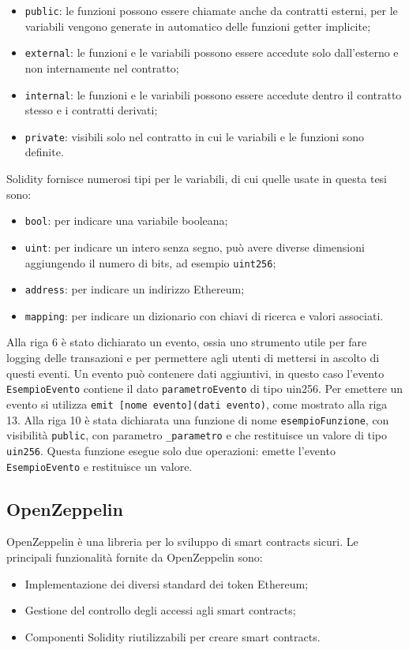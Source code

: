 \documentclass[a4paper]{article}
\begin{document}
      \begin{itemize}
        \item \verb|public|: le funzioni possono essere chiamate anche da contratti esterni, per le variabili vengono generate in automatico delle funzioni getter implicite;
        \item \verb|external|: le funzioni e le variabili possono essere accedute solo dall'esterno e non internamente nel contratto;
        \item \verb|internal|: le funzioni e le variabili possono essere accedute dentro il contratto stesso e i contratti derivati;
        \item \verb|private|: visibili solo nel contratto in cui le variabili e le funzioni sono definite\cite{solidityvisibility}.
      \end{itemize}
      Solidity fornisce numerosi tipi per le variabili, di cui quelle usate in questa tesi sono:
      \begin{itemize}
        \item \verb|bool|: per indicare una variabile booleana;
        \item \verb|uint|: per indicare un intero senza segno, può avere diverse dimensioni aggiungendo il numero di bits, ad esempio \verb|uint256|;
        \item \verb|address|: per indicare un indirizzo Ethereum;
        \item \verb|mapping|: per indicare un dizionario con chiavi di ricerca e valori associati\cite{soliditytypes}.
      \end{itemize}
      Alla riga 6 è stato dichiarato un evento, ossia uno strumento utile per fare logging delle transazioni e per permettere agli utenti di mettersi in ascolto di questi eventi.
      Un evento può contenere dati aggiuntivi, in questo caso l'evento \verb|EsempioEvento| contiene il dato \verb|parametroEvento| di tipo uin256.
      Per emettere un evento si utilizza \verb|emit [nome evento](dati evento)|, come mostrato alla riga 13.
      \newline
      Alla riga 10 è stata dichiarata una funzione di nome \verb|esempioFunzione|, con visibilità \verb|public|, con parametro \verb|_parametro| e che restituisce un valore di tipo \verb|uin256|.
      Questa funzione esegue solo due operazioni: emette l'evento \verb|EsempioEvento| e restituisce un valore. 

    \subsection{OpenZeppelin}
    OpenZeppelin è una libreria per lo sviluppo di smart contracts sicuri. Le principali funzionalità fornite da OpenZeppelin sono:
    \begin{itemize}
    \item Implementazione dei diversi standard dei token Ethereum;
    \item Gestione del controllo degli accessi agli smart contracts;
    \item Componenti Solidity riutilizzabili per creare smart contracts\cite{openzeppelin}.
    \end{itemize}
\end{document}

